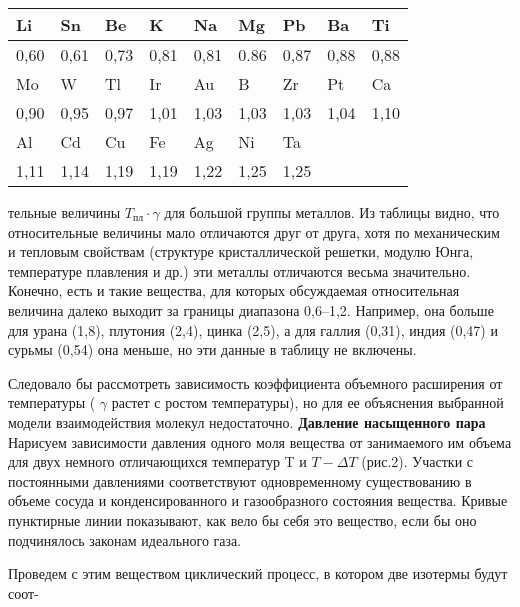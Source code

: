\begin{multicols}{2}
\begin{tabel}
\flushright\caption{\textit{Таблица 2}}   

\begin{tabular}{|p{}|p{}|p{}|p{}|p{}|p{}|p{}|p{}|p{}|}

\hline
   \cellcolor{lightgray}Li & \cellcolor{lightgray}Sn & \cellcolor{lightgray}Be & \cellcolor{lightgray}K & \cellcolor{lightgray}Na & 
   \cellcolor{lightgray}Mg & \cellcolor{lightgray}Pb & \cellcolor{lightgray}Ba & \cellcolor{lightgray}Ti\\
\hline 
    0,60&0,61&0,73 & 0,81 & 0,81 & 0.86 & 0,87 & 0,88 & 0,88\\
\hline
    \cellcolor{lightgray}Mo & \cellcolor{lightgray}W & \cellcolor{lightgray}Tl & \cellcolor{lightgray}Ir & \cellcolor{lightgray}Au & 
    \cellcolor{lightgray}B & \cellcolor{lightgray}Zr & \cellcolor{lightgray}Pt & \cellcolor{lightgray}Ca\\
\hline
0,90&0,95&0,97&1,01&1,03&1,03&1,03&1,04&1,10\\
\hline
    \cellcolor{lightgray}Al & \cellcolor{lightgray}Cd & \cellcolor{lightgray}Cu & \cellcolor{lightgray}Fe & \cellcolor{lightgray}Ag & 
    \cellcolor{lightgray}Ni & \cellcolor{lightgray}Ta & \cellcolor{lightgray}& \cellcolor{lightgray}\\
\hline
    1,11&1,14&1,19&1,19&1,22&1,25&1,25&&\\
\hline
\end{tabular}
\end{tabel}
\flushleft тельные величины $T_\text{пл}\cdot \gamma$ для большой группы металлов. Из таблицы видно, что относительные величины мало отличаются друг
от друга, хотя по механическим и тепловым свойствам (структуре кристаллической
решетки, модулю Юнга, температуре плавления и др.) эти металлы отличаются весьма значительно. Конечно, есть и такие вещества, для которых обсуждаемая относительная величина далеко выходит за границы диапазона 0,6–1,2. Например, она больше для урана (1,8), плутония (2,4), цинка
(2,5), а для галлия (0,31), индия (0,47) и
сурьмы (0,54) она меньше, но эти данные в
таблицу не включены.

\hspace{0.3cm}Следовало бы рассмотреть зависимость
коэффициента объемного расширения от
температуры ( $\gamma$ растет с ростом температуры), но для ее объяснения выбранной модели взаимодействия молекул недостаточно.
\center \textbf{Давление насыщенного пара}
\flushleft
\hspace{0.3cm}Нарисуем зависимости давления одного
моля вещества от занимаемого им объема для
двух немного отличающихся температур T
и $T-\Delta T$ (рис.2). Участки с постоянными
давлениями соответствуют одновременному
существованию в объеме сосуда и конденсированного и газообразного состояния вещества. Кривые пунктирные линии показывают, как вело бы себя это вещество, если бы
оно подчинялось законам идеального газа.

\hspace{0.3cm}Проведем с этим веществом циклический
процесс, в котором две изотермы будут соот-
\end{multicols}
